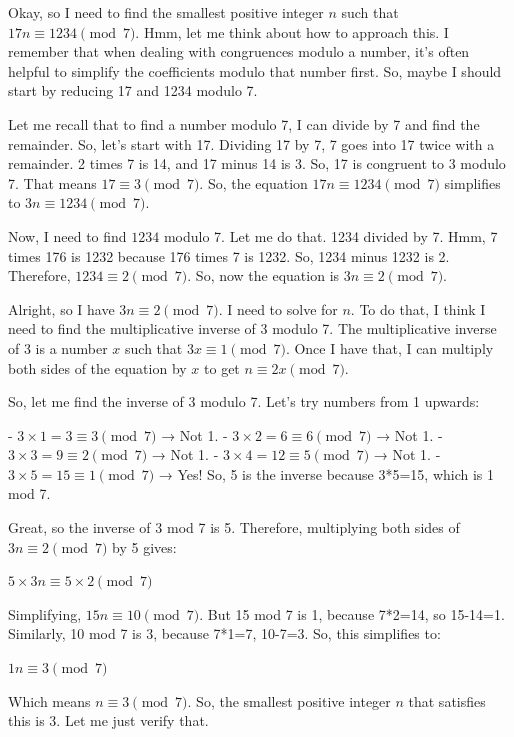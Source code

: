 \begin{tcolorbox}[modelbox, title=SPO-tree]
Okay, so I need to find the smallest positive integer \( n \) such that \( 17n \equiv 1234 \pmod{7} \). Hmm, let me think about how to approach this. I remember that when dealing with congruences modulo a number, it's often helpful to simplify the coefficients modulo that number first. So, maybe I should start by reducing 17 and 1234 modulo 7.

Let me recall that to find a number modulo 7, I can divide by 7 and find the remainder. So, let's start with 17. Dividing 17 by 7, 7 goes into 17 twice with a remainder. 2 times 7 is 14, and 17 minus 14 is 3. So, 17 is congruent to 3 modulo 7. That means \( 17 \equiv 3 \pmod{7} \). So, the equation \( 17n \equiv 1234 \pmod{7} \) simplifies to \( 3n \equiv 1234 \pmod{7} \).

Now, I need to find \( 1234 \) modulo 7. Let me do that. 1234 divided by 7. Hmm, 7 times 176 is 1232 because 176 times 7 is 1232. So, 1234 minus 1232 is 2. Therefore, \( 1234 \equiv 2 \pmod{7} \). So, now the equation is \( 3n \equiv 2 \pmod{7} \).

Alright, so I have \( 3n \equiv 2 \pmod{7} \). I need to solve for \( n \). To do that, I think I need to find the multiplicative inverse of 3 modulo 7. The multiplicative inverse of 3 is a number \( x \) such that \( 3x \equiv 1 \pmod{7} \). Once I have that, I can multiply both sides of the equation by \( x \) to get \( n \equiv 2x \pmod{7} \).

So, let me find the inverse of 3 modulo 7. Let's try numbers from 1 upwards:

- \( 3 \times 1 = 3 \equiv 3 \pmod{7} \) → Not 1.
- \( 3 \times 2 = 6 \equiv 6 \pmod{7} \) → Not 1.
- \( 3 \times 3 = 9 \equiv 2 \pmod{7} \) → Not 1.
- \( 3 \times 4 = 12 \equiv 5 \pmod{7} \) → Not 1.
- \( 3 \times 5 = 15 \equiv 1 \pmod{7} \) → Yes! So, 5 is the inverse because 3*5=15, which is 1 mod 7.

Great, so the inverse of 3 mod 7 is 5. Therefore, multiplying both sides of \( 3n \equiv 2 \pmod{7} \) by 5 gives:

\( 5 \times 3n \equiv 5 \times 2 \pmod{7} \)

Simplifying, \( 15n \equiv 10 \pmod{7} \). But 15 mod 7 is 1, because 7*2=14, so 15-14=1. Similarly, 10 mod 7 is 3, because 7*1=7, 10-7=3. So, this simplifies to:

\( 1n \equiv 3 \pmod{7} \)

Which means \( n \equiv 3 \pmod{7} \). So, the smallest positive integer \( n \) that satisfies this is 3. Let me just verify that.


\end{tcolorbox}
